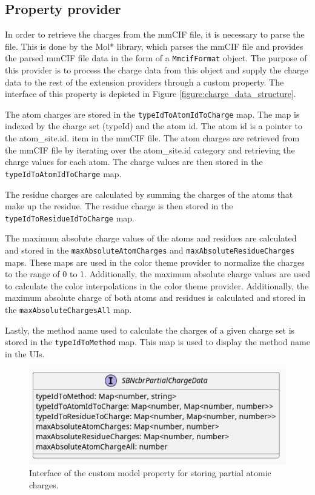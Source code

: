 \documentclass[
  digital,     %
  oneside,     %
  nosansbold,  %
  nocolorbold, %
  lof,         %
  lot,         %
]{fithesis4}
\begin{document}
\subsection{Property provider}
\label{subsection:property_provider}

In order to retrieve the charges from the mmCIF file, it is necessary to parse the file. This is done by the Mol* library, which parses the mmCIF file and provides the parsed mmCIF file data in the form of a \texttt{MmcifFormat} object. The purpose of this provider is to process the charge data from this object and supply the charge data to the rest of the extension providers through a custom property. The interface of this property is depicted in Figure \ref{figure:charge_data_structure}.

The atom charges are stored in the \texttt{typeIdToAtomIdToCharge} map. The map is indexed by the charge set (typeId) and the atom id. The atom id is a pointer to the atom\_site.id. item in the mmCIF file. The atom charges are retrieved from the mmCIF file by iterating over the atom\_site.id category and retrieving the charge values for each atom. The charge values are then stored in the \texttt{typeIdToAtomIdToCharge} map.

The residue charges are calculated by summing the charges of the atoms that make up the residue. The residue charge is then stored in the \texttt{typeIdToResidueIdToCharge} map.

The maximum absolute charge values of the atoms and residues are calculated and stored in the \texttt{maxAbsoluteAtomCharges} and \texttt{maxAbsoluteResidueCharges} maps. These maps are used in the color theme provider to normalize the charges to the range of 0 to 1. Additionally, the maximum absolute charge values are used to calculate the color interpolations in the color theme provider. Additionally, the maximum absolute charge of both atoms and residues is calculated and stored in the \texttt{maxAbsoluteChargesAll} map.

Lastly, the method name used to calculate the charges of a given charge set is stored in the \texttt{typeIdToMethod} map. This map is used to display the method name in the UIs.

\begin{figure}[htbp]
  \begin{center}
    \includegraphics[width=\textwidth]{out/figures/uml/interface/custom model property interface.png}
  \end{center}
  \caption{Interface of the custom model property for storing partial atomic charges.}
  \label{fig:property_provider_interface}
\end{figure}
\end{document}
